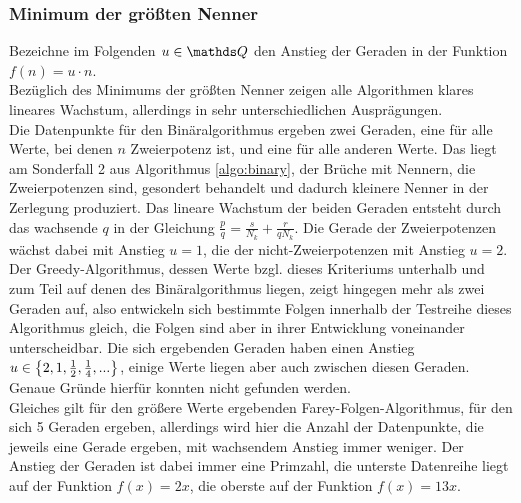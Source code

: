 \subsubsection{Minimum der größten Nenner}
Bezeichne im Folgenden $u \in \Q$ den Anstieg der Geraden in der Funktion $f(n)=u \cdot n$.\\
Bezüglich des Minimums der größten Nenner zeigen alle Algorithmen klares lineares Wachstum, allerdings in sehr unterschiedlichen Ausprägungen.\\ 
Die Datenpunkte für den Binäralgorithmus ergeben zwei Geraden, eine für alle Werte, bei denen $n$ Zweierpotenz ist, und eine für alle anderen Werte. Das liegt am Sonderfall 2 aus Algorithmus \ref{algo:binary}, der Brüche mit Nennern, die Zweierpotenzen sind, gesondert behandelt und dadurch kleinere Nenner in der Zerlegung produziert. Das lineare Wachstum der beiden Geraden entsteht durch das wachsende $q$ in der Gleichung $\frac{p}{q} = \frac{s}{N_k} + \frac{r}{qN_k}$. Die Gerade der Zweierpotenzen wächst dabei mit Anstieg $u = 1$, die der nicht-Zweierpotenzen mit Anstieg $u=2$.\\
Der Greedy-Algorithmus, dessen Werte bzgl. dieses Kriteriums unterhalb und zum Teil auf denen des Binäralgorithmus liegen, zeigt hingegen mehr als zwei Geraden auf, also entwickeln sich bestimmte Folgen innerhalb der Testreihe dieses Algorithmus gleich, die Folgen sind aber in ihrer Entwicklung voneinander unterscheidbar. Die sich ergebenden Geraden haben einen Anstieg $u \in \left\{ 2, 1, \frac{1}{2}, \frac{1}{4}, ... \right\}$, einige Werte liegen aber auch zwischen diesen Geraden. Genaue Gründe hierfür konnten nicht gefunden werden.\\
Gleiches gilt für den größere Werte ergebenden Farey-Folgen-Algorithmus, für den sich 5 Geraden ergeben, allerdings wird hier die Anzahl der Datenpunkte, die jeweils eine Gerade ergeben, mit wachsendem Anstieg immer weniger. Der Anstieg der Geraden ist dabei immer eine Primzahl, die unterste Datenreihe liegt auf der Funktion $f(x)=2x$, die oberste auf der Funktion $f(x) = 13x$. 


